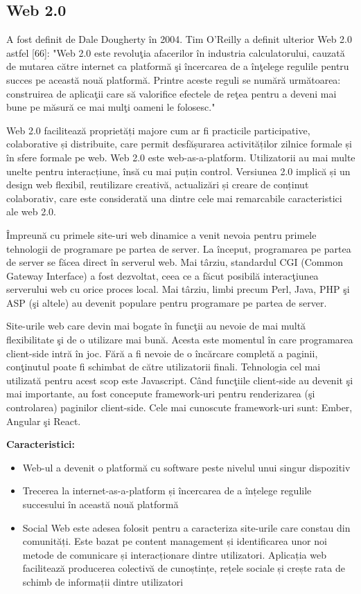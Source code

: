 \documentclass[12pt, a4paper]{report}
\begin{document}
\subsection{Web 2.0}

A fost definit de Dale Dougherty în 2004. Tim O'Reilly a definit ulterior Web 2.0 astfel [66]:
"Web 2.0 este revolu\c tia afacerilor \^ in industria calculatorului, cauzat\u a de mutarea c\u atre internet ca platform\u a \c si \^ incercarea de a \^ in\c telege regulile pentru succes pe aceast\u a nou\u a platform\u a. Printre aceste reguli se num\u ar\u a urm\u atoarea: construirea de aplica\c tii care s\u a valorifice efectele de re\c tea pentru a deveni mai bune pe m\u asur\u a ce mai mul\c ti oameni le folosesc."

Web 2.0 facilitează proprietăți majore cum ar fi practicile participative, colaborative și distribuite, care permit desfășurarea activităților zilnice formale și în sfere formale pe web. Web 2.0 este web-as-a-platform. Utilizatorii au mai multe unelte pentru interacțiune, însă cu mai puțin control. Versiunea 2.0 implică și un design web flexibil, reutilizare creativă, actualizări și creare de conținut colaborativ, care este considerată una dintre cele mai remarcabile caracteristici ale web 2.0.

\^ Impreun\u a cu primele site-uri web dinamice a venit nevoia pentru primele tehnologii de programare pe partea de server. La \^ inceput, programarea pe partea de server se f\u acea direct \^ in serverul web. Mai t\^ arziu, standardul CGI (Common Gateway Interface) a fost dezvoltat, ceea ce a f\u acut posibil\u a interac\c tiunea serverului web cu orice proces local.
Mai t\^ arziu, limbi precum Perl, Java, PHP \c si ASP (\c si altele) au devenit populare pentru programare pe partea de server.

Site-urile web care devin mai bogate \^ in func\c tii au nevoie de mai mult\u a flexibilitate \c si de o utilizare mai bun\u a. Acesta este momentul \^ in care programarea client-side intr\u a \^ in joc. F\u ar\u a a fi nevoie de o \^ inc\u arcare complet\u a a paginii, con\c tinutul poate fi schimbat de c\u atre utilizatorii finali. Tehnologia cel mai utilizat\u a pentru acest scop este Javascript.
C\^ and func\c tiile client-side au devenit \c si mai importante, au fost concepute framework-uri pentru renderizarea (\c si controlarea) paginilor client-side. Cele mai cunoscute framework-uri sunt: Ember, Angular \c si React.

\textbf{Caracteristici:}
\begin{itemize}
	\item Web-ul a devenit o platformă cu software peste nivelul unui singur dispozitiv
	\item Trecerea la internet-as-a-platform și încercarea de a înțelege regulile succesului în această nouă platformă
	\item Social Web este adesea folosit pentru a caracteriza site-urile care constau din comunități. Este bazat pe content management și identificarea unor noi metode de comunicare și interacționare dintre utilizatori. Aplicația web facilitează producerea colectivă de cunoștințe, rețele sociale și crește rata de schimb de informații dintre utilizatori
\end{itemize}
\end{document}
